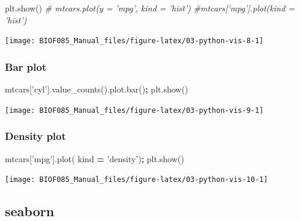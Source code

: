 \documentclass[
  letterpaper,
]{scrbook}
\newenvironment{Shaded}{\begin{snugshade}}{\end{snugshade}}
\newcommand{\CommentTok}[1]{\textcolor[rgb]{0.56,0.35,0.01}{\textit{#1}}}
\newcommand{\NormalTok}[1]{#1}
\newcommand{\OperatorTok}[1]{\textcolor[rgb]{0.81,0.36,0.00}{\textbf{#1}}}
\newcommand{\StringTok}[1]{\textcolor[rgb]{0.31,0.60,0.02}{#1}}
\begin{document}
\begin{Shaded}
\begin{Highlighting}[]
\NormalTok{plt.show()}
\CommentTok{# mtcars.plot(y = 'mpg', kind = 'hist')}
\CommentTok{#mtcars['mpg'].plot(kind = 'hist')}
\end{Highlighting}
\end{Shaded}

\begin{center}\texttt{[image: BIOF085\_Manual\_files/figure-latex/03-python-vis-8-1]} \end{center}

\hypertarget{bar-plot}{%
\subsubsection{Bar plot}\label{bar-plot}}

\begin{Shaded}
\begin{Highlighting}[]
\NormalTok{mtcars[}\StringTok{'cyl'}\NormalTok{].value_counts().plot.bar()}\OperatorTok{;}
\NormalTok{plt.show()}
\end{Highlighting}
\end{Shaded}

\begin{center}\texttt{[image: BIOF085\_Manual\_files/figure-latex/03-python-vis-9-1]} \end{center}

\hypertarget{density-plot}{%
\subsubsection{Density plot}\label{density-plot}}

\begin{Shaded}
\begin{Highlighting}[]
\NormalTok{mtcars[}\StringTok{'mpg'}\NormalTok{].plot( kind }\OperatorTok{=} \StringTok{'density'}\NormalTok{)}\OperatorTok{;}
\NormalTok{plt.show()}
\end{Highlighting}
\end{Shaded}

\begin{center}\texttt{[image: BIOF085\_Manual\_files/figure-latex/03-python-vis-10-1]} \end{center}

\hypertarget{seaborn}{%
\subsection{seaborn}\label{seaborn}}
\end{document}

